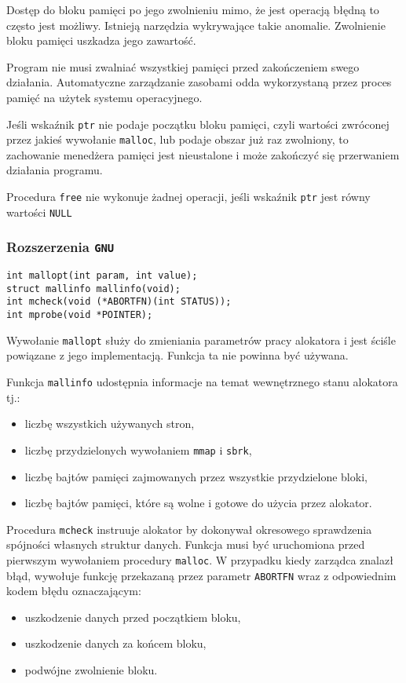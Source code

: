 \documentclass[12pt,a4paper,titlepage,twoside]{mwart}
\begin{document}
Dostęp do bloku pamięci po jego zwolnieniu mimo, że jest operacją błędną to
często jest możliwy. Istnieją narzędzia wykrywające takie anomalie. Zwolnienie
bloku pamięci uszkadza jego zawartość.

Program nie musi zwalniać wszystkiej pamięci przed zakończeniem swego
działania. Automatyczne zarządzanie zasobami odda wykorzystaną przez proces
pamięć na użytek systemu operacyjnego.

Jeśli wskaźnik \texttt{ptr} nie podaje początku bloku pamięci, czyli wartości
zwróconej przez jakieś wywołanie \texttt{malloc}, lub podaje obszar już raz
zwolniony, to zachowanie menedżera pamięci jest nieustalone i może
zakończyć się przerwaniem działania programu.

Procedura \texttt{free} nie wykonuje żadnej operacji, jeśli wskaźnik
\texttt{ptr} jest równy wartości \texttt{NULL}

\subsubsection{Rozszerzenia \texttt{GNU}}

\vspace{2ex}
\begin{lstlisting}[caption={Prototypy pozostałych procedur i zmiennych.}]
int mallopt(int param, int value);
struct mallinfo mallinfo(void);
int mcheck(void (*ABORTFN)(int STATUS));
int mprobe(void *POINTER);
\end{lstlisting}

Wywołanie \texttt{mallopt} służy do zmieniania parametrów pracy alokatora i
jest ściśle powiązane z jego implementacją. Funkcja ta nie powinna być używana.

Funkcja \texttt{mallinfo} udostępnia informacje na temat wewnętrznego stanu
alokatora tj.: 
\begin{itemize}
\item liczbę wszystkich używanych stron,
\item liczbę przydzielonych wywołaniem \texttt{mmap} i \texttt{sbrk},
\item liczbę bajtów pamięci zajmowanych przez wszystkie przydzielone bloki,
\item liczbę bajtów pamięci, które są wolne i gotowe do użycia przez alokator.
\end{itemize}

Procedura \texttt{mcheck} instruuje alokator by dokonywał okresowego
sprawdzenia spójności własnych struktur danych. Funkcja musi być uruchomiona
przed pierwszym wywołaniem procedury \texttt{malloc}. W przypadku kiedy
zarządca znalazł błąd, wywołuje funkcję przekazaną przez parametr
\texttt{ABORTFN} wraz z odpowiednim kodem błędu oznaczającym:
\begin{itemize}
\item uszkodzenie danych przed początkiem bloku,
\item uszkodzenie danych za końcem bloku,
\item podwójne zwolnienie bloku.
\end{itemize}
\end{document}

